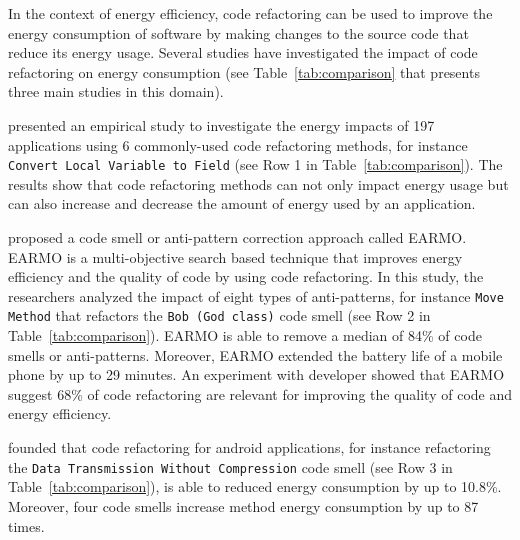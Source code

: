 \vspace{.5em}
In the context of energy efficiency, code refactoring can be used to improve the energy consumption of software by making changes to the source code that reduce its energy usage. Several studies have investigated the impact of code refactoring on energy consumption (see Table~\ref{tab:comparison} that presents three main studies in this domain). 

\cite{DBLP:conf/esem/SahinPC14} presented an empirical study to investigate the energy impacts of 197 applications using 6 commonly-used code refactoring methods, for instance \texttt{Convert Local Variable to Field} (see Row 1 in Table~\ref{tab:comparison}). The results show that code refactoring methods can not only impact energy usage but can also increase and decrease the amount of energy used by an application. 

\cite{DBLP:journals/tse/MoralesSKCA18} proposed a code smell or anti-pattern correction approach called EARMO. EARMO is a multi-objective search based technique that improves energy efficiency and the quality of code by using code refactoring. In this study, the researchers analyzed the impact of eight types of anti-patterns, for instance \texttt{Move Method} that refactors the \texttt{Bob (God class)} code smell (see Row 2 in Table~\ref{tab:comparison}).
EARMO is able to
remove a median of 84\% of code smells or anti-patterns. Moreover, EARMO extended the battery life of a mobile phone by up to 29 minutes. 
An experiment with developer showed that EARMO suggest 68\% of code refactoring  are relevant for improving the quality of code and energy efficiency. 

\cite{DBLP:journals/infsof/PalombaNPZL19} founded that code refactoring for android applications, for instance refactoring the \texttt{Data Transmission Without Compression} code smell (see Row 3 in Table~\ref{tab:comparison}), is able to reduced energy consumption by up to 10.8\%. Moreover, four code smells increase method energy consumption by up to 87 times.


